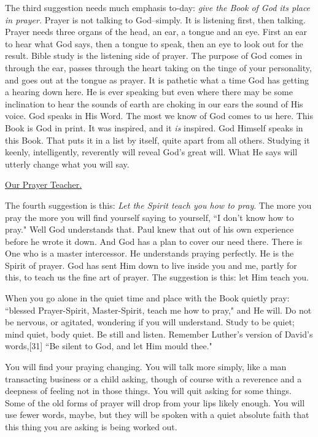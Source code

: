 The third suggestion needs much emphasis to-day: \textit{give the Book of God its
place in prayer.} Prayer is not talking to God--simply. It is listening
first, then talking. Prayer needs three organs of the head, an ear, a
tongue and an eye. First an ear to hear what God says, then a tongue to
speak, then an eye to look out for the result. Bible study is the
listening side of prayer. The purpose of God comes in through the ear,
passes through the heart taking on the tinge of your personality, and goes
out at the tongue as prayer. It is pathetic what a time God has getting a
hearing down here. He is ever speaking but even where there may be some
inclination to hear the sounds of earth are choking in our ears the sound
of His voice. God speaks in His Word. The most we know of God comes to us
here. This Book is God in print. It was inspired, and it \textit{is} inspired.
God Himself speaks in this Book. That puts it in a list by itself, quite
apart from all others. Studying it keenly, intelligently, reverently will
reveal God's great will. What He says will utterly change what you will
say.



\underline{Our Prayer Teacher.}


The fourth suggestion is this: \textit{Let the Spirit teach you how to pray}. The
more you pray the more you will find yourself saying to yourself, ``I don't
know how to pray." Well God understands that. Paul knew that out of his
own experience before he wrote it down. And God has a plan to cover our
need there. There is One who is a master intercessor. He understands
praying perfectly. He is the Spirit of prayer. God has sent Him down to
live inside you and me, partly for this, to teach us the fine art of
prayer. The suggestion is this: let Him teach you.

When you go alone in the quiet time and place with the Book quietly pray:
``blessed Prayer-Spirit, Master-Spirit, teach me how to pray," and He will.
Do not be nervous, or agitated, wondering if you will understand. Study to
be quiet; mind quiet, body quiet. Be still and listen. Remember Luther's
version of David's words,[31] ``Be silent to God, and let Him mould thee."

You will find your praying changing. You will talk more simply, like a man
transacting business or a child asking, though of course with a reverence
and a deepness of feeling not in those things. You will quit asking for
some things. Some of the old forms of prayer will drop from your lips
likely enough. You will use fewer words, maybe, but they will be spoken
with a quiet absolute faith that this thing you are asking is being worked
out.


